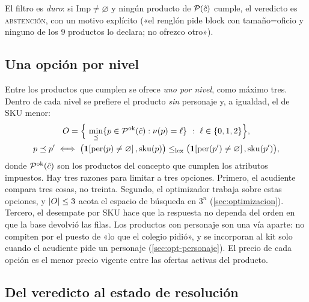 El filtro es \emph{duro}: si $\mathrm{Imp}\neq\varnothing$ y ningún producto de
$\mathcal{P}(\hat c)$ cumple, el veredicto es \textsc{abstención}, con un motivo
explícito («el renglón pide block con tamaño=oficio y ninguno de los 9
productos lo declara; no ofrezco otro»).

\subsection{Una opción por nivel}
\label{sec:res-niveles}

Entre los productos que cumplen se ofrece \emph{uno por nivel}, como máximo
tres. Dentro de cada nivel se prefiere el producto \emph{sin} personaje y, a
igualdad, el de SKU menor:
\begin{gather*}
  O=\Bigl\{\ \min_{\preceq}\{p\in\mathcal{P}^{\mathrm{ok}}(\hat c) : \nu(p)=\ell\}\
  :\ \ell\in\{0,1,2\}\Bigr\},\\
  p\preceq p' \iff \bigl(\mathbf{1}\!\left[\mathrm{per}(p)\neq\varnothing\right],\mathrm{sku}(p)\bigr)
  \leq_{\mathrm{lex}}\bigl(\mathbf{1}\!\left[\mathrm{per}(p')\neq\varnothing\right],\mathrm{sku}(p')\bigr),
\end{gather*}
donde $\mathcal{P}^{\mathrm{ok}}(\hat c)$ son los productos del concepto que cumplen
los atributos impuestos.
Hay tres razones para limitar a tres opciones. Primero, el acudiente compara
tres cosas, no treinta. Segundo, el optimizador trabaja sobre estas opciones,
y $\left\lvert O \right\rvert\leq3$ acota el espacio de búsqueda en $3^n$
(\cref{sec:optimizacion}). Tercero, el desempate por SKU hace que la respuesta
no dependa del orden en que la base devolvió las filas. Los productos con
personaje son una vía aparte: no compiten por el puesto de «lo que el colegio
pidió», y se incorporan al kit solo cuando el acudiente pide un personaje
(\cref{sec:opt-personaje}). El precio de cada opción es el menor precio
vigente entre las ofertas activas del producto.

\subsection{Del veredicto al estado de resolución}
\label{sec:res-estados}

